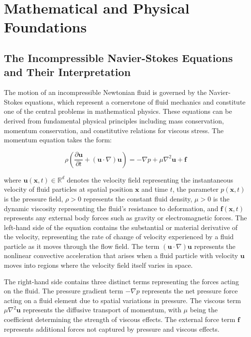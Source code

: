﻿\documentclass[a4paper,11pt]{article}
\theoremstyle{definition}
\begin{document}
\section{Mathematical and Physical Foundations}

\subsection{The Incompressible Navier-Stokes Equations and Their Interpretation}

The motion of an incompressible Newtonian fluid is governed by the Navier-Stokes equations, which represent a cornerstone of fluid mechanics and constitute one of the central problems in mathematical physics. These equations can be derived from fundamental physical principles including mass conservation, momentum conservation, and constitutive relations for viscous stress. The momentum equation takes the form:

\begin{equation}
\rho \left( \frac{\partial \mathbf{u}}{\partial t} + (\mathbf{u} \cdot \nabla) \mathbf{u} \right) = -\nabla p + \mu \nabla^2 \mathbf{u} + \mathbf{f}
\label{eq:ns_momentum}
\end{equation}

where $\mathbf{u}(\mathbf{x},t) \in \mathbb{R}^d$ denotes the velocity field representing the instantaneous velocity of fluid particles at spatial position $\mathbf{x}$ and time $t$, the parameter $p(\mathbf{x},t)$ is the pressure field, $\rho > 0$ represents the constant fluid density, $\mu > 0$ is the dynamic viscosity representing the fluid's resistance to deformation, and $\mathbf{f}(\mathbf{x},t)$ represents any external body forces such as gravity or electromagnetic forces. The left-hand side of the equation contains the substantial or material derivative of the velocity, representing the rate of change of velocity experienced by a fluid particle as it moves through the flow field. The term $(\mathbf{u} \cdot \nabla) \mathbf{u}$ represents the nonlinear convective acceleration that arises when a fluid particle with velocity $\mathbf{u}$ moves into regions where the velocity field itself varies in space.

The right-hand side contains three distinct terms representing the forces acting on the fluid. The pressure gradient term $-\nabla p$ represents the net pressure force acting on a fluid element due to spatial variations in pressure. The viscous term $\mu \nabla^2 \mathbf{u}$ represents the diffusive transport of momentum, with $\mu$ being the coefficient determining the strength of viscous effects. The external force term $\mathbf{f}$ represents additional forces not captured by pressure and viscous effects.
\end{document}
